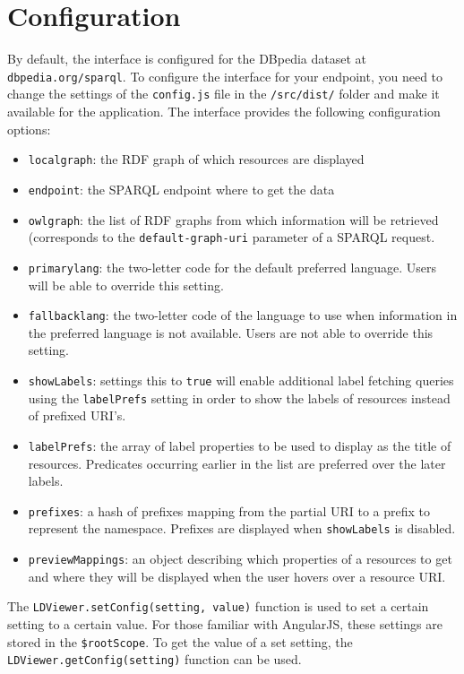 \documentclass{article}
\begin{document}
\section{Configuration}
\label{sec:deploy}
By default, the interface is configured for the DBpedia dataset at \texttt{dbpedia.org/sparql}.
To configure the interface for your endpoint, you need to change the settings of the \texttt{config.js} file in the \texttt{/src/dist/} folder and make it available for the application.
The interface provides the following configuration options:
\begin{itemize}
\item \texttt{localgraph}: the RDF graph of which resources are displayed
\item \texttt{endpoint}: the SPARQL endpoint where to get the data
\item \texttt{owlgraph}: the list of RDF graphs from which information will be retrieved (corresponds to the \texttt{default-graph-uri} parameter of a SPARQL request.
\item \texttt{primarylang}: the two-letter code for the default preferred language. Users will be able to override this setting.
\item \texttt{fallbacklang}: the two-letter code of the language to use when information in the preferred language is not available. Users are not able to override this setting.
\item \texttt{showLabels}: settings this to \texttt{true} will enable additional label fetching queries using the \texttt{labelPrefs} setting in order to show the labels of resources instead of prefixed URI's.
\item \texttt{labelPrefs}: the array of label properties to be used to display as the title of resources. Predicates occurring earlier in the list are preferred over the later labels.
\item \texttt{prefixes}: a hash of prefixes mapping from the partial URI to a prefix to represent the namespace. Prefixes are displayed when \texttt{showLabels} is disabled.
\item \texttt{previewMappings}: an object describing which properties of a resources to get and where they will be displayed when the user hovers over a resource URI.
\end{itemize}

The \texttt{LDViewer.setConfig(setting, value)} function is used to set a certain setting to a certain value. For those familiar with AngularJS, these settings are stored in the \texttt{\$rootScope}.
To get the value of a set setting, the \texttt{LDViewer.getConfig(setting)} function can be used.
\end{document}
